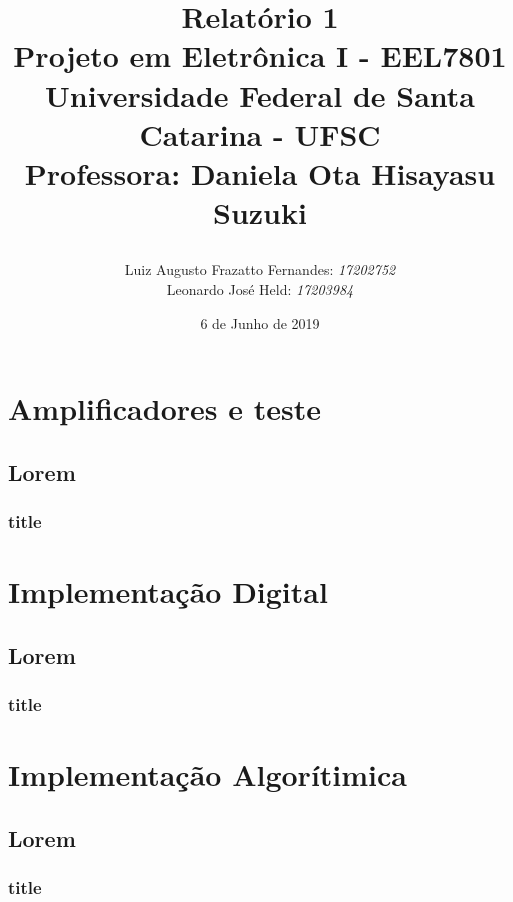 \documentclass[11pt,a4paper]{report}
\title{Relatório 1  \\
	Projeto em Eletrônica I - EEL7801 \\ \vfill
	\normalsize{Universidade Federal de Santa Catarina - UFSC \\
		Professora: Daniela Ota Hisayasu Suzuki}
	\author{
		{Luiz Augusto Frazatto Fernandes: \it{17202752}} \\
		{Leonardo José Held: \it{17203984}}
}
}
\date{6 de Junho de 2019}
\begin{document}
	\maketitle
	\setcounter{chapter}{0}
\chapter{Amplificadores e teste}
	\section{Lorem}
	\subsection{title}

	

	\chapter{Implementação Digital}
	
	\section{Lorem}
	\subsection{title}
	
	\chapter{Implementação Algorítimica}
	
	
	\section{Lorem}
	\subsection{title}
	
\end{document}
